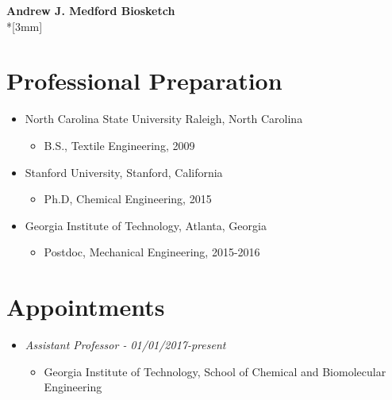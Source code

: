 \renewcommand{\LeftFooter}{Biosketch}
\renewcommand{\LeftHeader}{Andrew J. Medford}
\renewcommand{\PageLimit}{2}
\begin{center}
{\bf Andrew J. Medford Biosketch} \\*[3mm]
\end{center}
\setcounter{section}{0}
\section{Professional Preparation}\label{AJM-professional-preparation}

\begin{itemize}
\itemsep1pt\parskip0pt
\item
  North Carolina State University Raleigh, North Carolina

  \begin{itemize}
  \itemsep1pt\parskip0pt
  \item
    B.S., Textile Engineering, 2009
  \end{itemize}
\item
  Stanford University, Stanford, California

  \begin{itemize}
  \itemsep1pt\parskip0pt
  \item
    Ph.D, Chemical Engineering, 2015
  \end{itemize}
\item
  Georgia Institute of Technology, Atlanta, Georgia

  \begin{itemize}
  \itemsep1pt\parskip0pt
  \item
    Postdoc, Mechanical Engineering, 2015-2016
  \end{itemize}
\end{itemize}

\section{Appointments}\label{AJM-appointments}

\begin{itemize}
\itemsep1pt\parskip0pt
\item
  \emph{Assistant Professor - 01/01/2017-present}

  \begin{itemize}
  \itemsep1pt\parskip0pt
  \item
    Georgia Institute of Technology, School of Chemical and Biomolecular
    Engineering
  \end{itemize}
\end{itemize}

